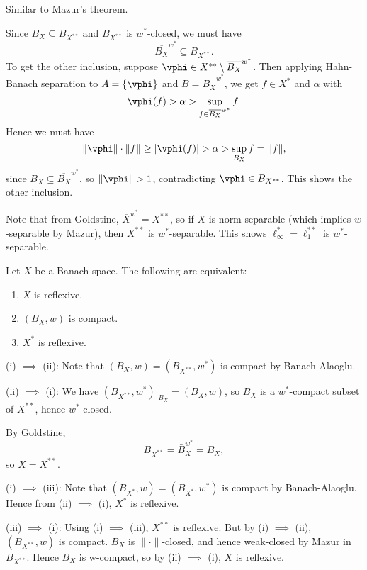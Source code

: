 \documentclass[12pt]{article}
\begin{document}
\begin{proofbox}
	Similar to Mazur's theorem.

	Since $B_X \subseteq B_{X^{\ast\ast}}$ and $B_{X^{\ast\ast}}$ is $w^{\ast}$-closed, we must have
	\[
	\overline{B_{X}}^{w^{\ast}} \subseteq B_{X^{\ast\ast}}.
	\]
	To get the other inclusion, suppose $\vphi \in X^{\ast\ast} \setminus \overline{B_X}^{w^{\ast}}$. Then applying Hahn-Banach separation to $A = \{\vphi\}$ and $B = \overline{B_X}^{w^{\ast}}$, we get $f \in X^{\ast}$ and $\alpha$ with
	\[
	\vphi(f) > \alpha > \sup_{f \in \overline{B_X}^{w^{\ast}}} f.
	\]
	Hence we must have
	\[
	\|\vphi\| \cdot \|f\| \geq |\vphi(f)| > \alpha > \sup_{B_X} f = \|f\|,
	\]
	since $B_X \subseteq \overline{B_X}^{w^{\ast}}$, so $\|\vphi\| > 1$, contradicting $\vphi \in B_{X^{\ast\ast}}$. This shows the other inclusion.
\end{proofbox}

Note that from Goldstine, $\overline{X}^{w^{\ast}} = X^{\ast\ast}$, so if $X$ is norm-separable (which implies $w$-separable by Mazur), then $X^{\ast\ast}$ is $w^{\ast}$-separable. This shows $\ell_\infty^{\ast} = \ell_1^{\ast\ast}$ is $w^{\ast}$-separable.


\begin{theorem}
	Let $X$ be a Banach space. The following are equivalent:
	\begin{enumerate}[\normalfont(i)]
		\item $X$ is reflexive.
		\item $(B_X, w)$ is compact.
		\item $X^{\ast}$ is reflexive.
	\end{enumerate}
\end{theorem}

\begin{proofbox}
	

	(i) $\implies$ (ii): Note that $(B_X, w) = (B_{X^{\ast\ast}}, w^{\ast})$ is compact by Banach-Alaoglu.

	(ii) $\implies$ (i): We have $(B_{X^{\ast\ast}}, w^{\ast})|_{B_X} = (B_X, w)$, so $B_X$ is a $w^{\ast}$-compact subset of $X^{\ast\ast}$, hence $w^{\ast}$-closed.

	By Goldstine,
	\[
	B_{X^{\ast\ast}} = \bar B_X^{w^{\ast}} = B_X,
	\]
	so $X = X^{\ast\ast}$.

	(i) $\implies$ (iii): Note that $(B_{X^{\ast}}, w) = (B_{X^{\ast}}, w^{\ast})$ is compact by Banach-Alaoglu. Hence from (ii) $\implies$ (i), $X^{\ast}$ is reflexive.

	(iii) $\implies$ (i): Using (i) $\implies$ (iii), $X^{\ast\ast}$ is reflexive. But by (i) $\implies$ (ii), $(B_{X^{\ast\ast}}, w)$ is compact. $B_X$ is $\|\cdot\|$-closed, and hence weak-closed by Mazur in $B_{X^{\ast\ast}}$. Hence $B_X$ is w-compact, so by (ii) $\implies$ (i), $X$ is reflexive.
\end{proofbox}
\end{document}
